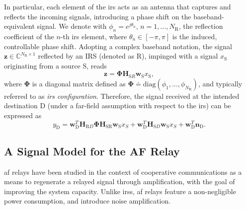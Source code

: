 
In particular, each element of the \gls{irs} acts as an 
antenna that captures and reflects the incoming signals, introducing a phase shift on the baseband-equivalent signal. We denote with $\phi_n=e^{j\theta_n}, \, n = 1, \ldots, N_{\mathrm R}$, the reflection coefficient of the $n$-th \gls{irs} element, where $\theta_n \in [-\pi,\pi ] $ is the induced, controllable phase shift. 
Adopting a complex baseband notation, the signal $\bm{z} \in {\mathbb C}^{N_{\mathrm R} \times 1} $ reflected by an IRS (denoted as R), impinged with a signal $x_{\mathrm S}$ originating from a source S, reads
\begin{equation}
\bm{z}=\bm{\Phi}\bm{H}_{\mathrm SR} \bm{w}_{\mathrm S} x_{\mathrm S} ,
\end{equation}
where $\bm{\Phi}$ is a diagonal matrix defined as $\bm{\Phi} \doteq \mathrm{diag} (\phi_1,\ldots,\phi_{N_{\mathrm R}})$, and typically referred to as {\em \gls{irs} configuration}. 
Therefore, the signal received at the intended destination D (under a far-field assumption with respect to the \gls{irs}) can be expressed as
\begin{equation}
	\label{eq:irs_iput_output}
    y_{\mathrm D} = \bm{w}_{\mathrm D}^{T} \bm{H}_{\mathrm RD} \bm{\Phi} \bm{H}_{\mathrm {SR}}  \bm{w}_{\mathrm S} x_S + \bm{w}_{\mathrm D}^{T} \bm{H}_{\mathrm SD} \bm{w}_{\mathrm S} x_S + \bm{w}_{\mathrm D}^{T} \bm{n}_{\mathrm D}.
\end{equation}
 
 \subsection{A Signal Model for the AF Relay}
 \label{sec:af_phy_model}
 
  \Gls{af} relays have been studied in the context of cooperative communications as a means to regenerate a relayed signal through amplification, with the goal of improving the system capacity. %
  Unlike \glspl{irs}, \gls{af} relays feature a non-negligible power consumption, and introduce noise amplification.

